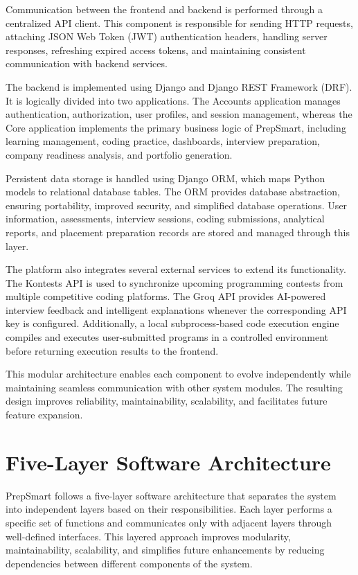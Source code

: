 Communication between the frontend and backend is performed through a centralized API client. This component is responsible for sending HTTP requests, attaching JSON Web Token (JWT) authentication headers, handling server responses, refreshing expired access tokens, and maintaining consistent communication with backend services.

The backend is implemented using Django and Django REST Framework (DRF). It is logically divided into two applications. The Accounts application manages authentication, authorization, user profiles, and session management, whereas the Core application implements the primary business logic of PrepSmart, including learning management, coding practice, dashboards, interview preparation, company readiness analysis, and portfolio generation.

Persistent data storage is handled using Django ORM, which maps Python models to relational database tables. The ORM provides database abstraction, ensuring portability, improved security, and simplified database operations. User information, assessments, interview sessions, coding submissions, analytical reports, and placement preparation records are stored and managed through this layer.

The platform also integrates several external services to extend its functionality. The Kontests API is used to synchronize upcoming programming contests from multiple competitive coding platforms. The Groq API provides AI-powered interview feedback and intelligent explanations whenever the corresponding API key is configured. Additionally, a local subprocess-based code execution engine compiles and executes user-submitted programs in a controlled environment before returning execution results to the frontend.

This modular architecture enables each component to evolve independently while maintaining seamless communication with other system modules. The resulting design improves reliability, maintainability, scalability, and facilitates future feature expansion.

\section{Five-Layer Software Architecture}

PrepSmart follows a five-layer software architecture that separates the system into independent layers based on their responsibilities. Each layer performs a specific set of functions and communicates only with adjacent layers through well-defined interfaces. This layered approach improves modularity, maintainability, scalability, and simplifies future enhancements by reducing dependencies between different components of the system.


